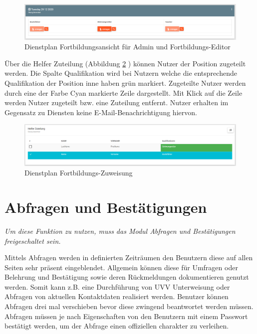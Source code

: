 \begin{figure}[h]
	\begin{addmargin}{-0.2\linewidth}
		\centering 
		\includegraphics[width=20cm]{Bilder/view_training_admin.png}
	\end{addmargin} 
	\caption[Fortbildungen Admin Ansicht]{Dienstplan Fortbildungsansicht für Admin und Fortbildungs-Editor}
	\label{fig:view_training_admin}
\end{figure}
Über die Helfer Zuteilung (Abbildung \ref{fig:view_training_assign} \textit{}) können Nutzer der Position zugeteilt werden. Die Spalte Qualifikation wird bei Nutzern welche die entsprechende Qualifikation der Position inne haben grün markiert. Zugeteilte Nutzer werden durch eine der Farbe Cyan markierte Zeile dargestellt. Mit Klick auf die Zeile werden Nutzer zugeteilt bzw. eine Zuteilung entfernt. Nutzer erhalten im Gegensatz zu Diensten keine E-Mail-Benachrichtigung hiervon.

\begin{figure}[h]
	\begin{addmargin}{-0.2\linewidth}
		\centering 
		\includegraphics[width=20cm]{Bilder/view_training_assign.png}
	\end{addmargin} 
	\caption[Fortbildungs-Zuweisung]{Dienstplan Fortbildungs-Zuweisung}
	\label{fig:view_training_assign}
\end{figure}

\section{Abfragen und Bestätigungen}
\label{sec:admin_survey}
\textit{{\small Um diese Funktion zu nutzen, muss das Modul Abfragen und Bestätigungen freigeschaltet sein.}}

Mittels Abfragen werden in definierten Zeiträumen den Benutzern diese auf allen Seiten sehr präsent eingeblendet. Allgemein können diese für Umfragen oder Belehrung und Bestätigung sowie deren Rückmeldungen dokumentieren genutzt werden. Somit kann z.B. eine Durchführung von UVV Unterweisung oder Abfragen von aktuellen Kontaktdaten realisiert werden.
Benutzer können Abfragen drei mal verschieben bevor diese zwingend beantwortet werden müssen. Abfragen müssen je nach Eigenschaften von den Benutzern mit einem Passwort bestätigt werden, um der Abfrage einen offiziellen charakter zu verleihen.

